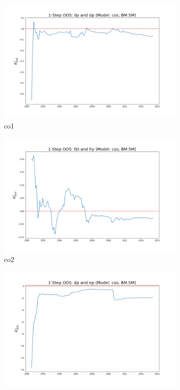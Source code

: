 \documentclass[a4paper,12pt,times,numbered,print,index]{report}
\numberwithin{equation}{section}
\begin{document}
	\begin{figure}[!htbp]
		\centering
		\caption{OOS Results for Model with $f_2$}
		\begin{subfigure}[b]{0.42\linewidth}
			\includegraphics[width=0.9\linewidth]{OOS_plots/cos_co1_SM.png}
			\caption{co1}
		\end{subfigure}
		\begin{subfigure}[b]{0.42\linewidth}
			\includegraphics[width=0.9\linewidth]{OOS_plots/cos_co2_SM.png}
			\caption{co2}
		\end{subfigure}
		\begin{subfigure}[b]{0.42\linewidth}
			\includegraphics[width=0.9\linewidth]{OOS_plots/cos_co3_SM.png}

\end{subfigure}
\end{figure}
\end{document}

